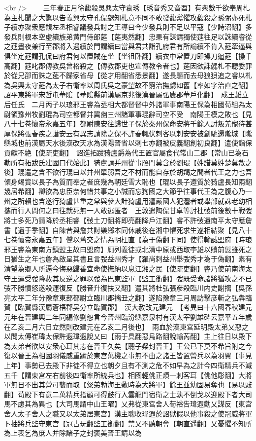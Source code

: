 <br />
　　三年春正月徐馥殺吳興太守袁琇【琇音秀又音酉】有衆數千欲奉周札為主札聞之大驚以告義興太守孔侃勰知札意不同不敢發馥黨懼攻馥殺之孫弼亦死札子續亦聚衆應馥左丞相睿議發兵討之王導曰今少發兵則不足以平寇【少詩沼翻】多發兵則根本空虛續族弟黄門侍郎莚【莚夷然翻】忠果有謀請獨使莚往足以誅續睿從之莚晝夜兼行至郡將入遇續於門謂續曰當與君共詣孔府君有所論續不肯入莚牽逼與俱坐定莚謂孔侃曰府君何以置賊在坐【坐徂卧翻】續衣中常置刀即操刀逼莚【操千高翻】莚叱郡傳教吳曾格殺之【傳教郡吏也宣傳教令者也】莚因欲誅勰札不聽委罪於從兄邵而誅之莚不歸家省母【從才用翻省悉景翻】遂長驅而去母狼狽追之睿以札為吳興太守莚為太子右衛率以周氏吳之豪望故不窮治撫勰如舊【率如字治直之翻】　詔平東將軍宋哲屯華隂【華隂縣前漢屬京兆後漢晉屬弘農郡華戶化翻】　成王雄立后任氏　二月丙子以琅邪王睿為丞相大都督督中外諸軍事南陽王保為相國荀組為太尉領豫州牧劉琨為司空都督并冀幽三州諸軍事琨辭司空不受　南陽王模之敗也【見八十七卷懷帝永嘉五年】都尉陳安往歸世子保於秦州保命安將千餘人討叛羌寵待甚厚保將張春疾之譖安云有異志請除之保不許春輒伏刺客以刺安安被創馳還隴城【隴縣城也前漢屬天水後漢改天水為漢陽晉省以刺七亦翻被皮義翻創初良翻】遣使詣保貢獻不絶【使疏吏翻】　詔進拓跋猗盧爵為代王置官屬食代常山二郡【常山已為石勒所有拓跋氏建國曰代始此】猗盧請并州從事鴈門莫含於劉琨【姓譜莫姓楚莫敖之後】琨遣之含不欲行琨曰以并州單弱吾之不材而能自存於胡羯之間者代王之力也吾傾身竭貲以長子為質而奉之者庶幾為朝廷雪大恥也【琨以長子遵質於猗盧長知兩翻幾居希翻】卿欲為忠臣奈何惜共事之小誠而忘狥國之大節乎往事代王為之腹心乃一州之所賴也含遂行猗盧甚重之常與參大計猗盧用灋嚴國人犯灋者或舉部就誅老幼相攜而行人問何之曰往就死無一人敢逃匿者　王敦遣陶侃甘卓等討杜弢前後數十戰弢將士多死乃請降於丞相睿【弢土刀翻將即亮翻降戶江翻】睿不許弢遺南平太守應詹書【遺于季翻】自陳昔與詹共討樂鄉本同休戚後在湘中懼死求生遂相結聚【見八十七卷懷帝永嘉五年】儻以舊交之情為明枉直【為于偽翻下同】使得輸誠盟府【時琅邪王睿為東南方鎮盟主故曰盟府】厠列義徒或北清中原或西取李雄以贖前愆雖死之日猶生之年也詹為啟呈其書且言弢益州秀才【羅尚刺益州舉弢秀才為于偽翻】素有清望為鄉人所逼今悔惡歸善宜命使撫納以息江湘之民【使疏吏翻】睿乃使前南海太守王運受弢降赦其反逆之罪以弢為巴東監軍【監工銜翻】弢既受命諸將猶攻之不已弢不勝憤怒遂殺運復反【勝音升復扶又翻】遣其將杜弘張彦殺臨川内史謝摛【吳孫亮太平二年分豫章東部都尉立臨川郡摛丑之翻】遂陷豫章三月周訪擊彦斬之弘犇臨賀【臨賀縣漢屬蒼梧郡吴分立臨賀郡】　漢大赦改元建元　【考異曰十六國春秋建元元年在晉建興二年同編修劉恕言今晉州臨汾縣嘉泉村有漢太宰劉雄碑云嘉平五年歲在乙亥二月六日立然則改建元在乙亥二月後也】　雨血於漢東宫延明殿太弟乂惡之以問太傅崔瑋太保許遐瑋遐說乂曰【雨于具翻惡烏路翻說輸芮翻】主上往日以殿下為太弟者欲以安衆心耳其志在晉王久矣【聰子粲封晉王】王公已下莫不希旨附之今復以晉王為相國羽儀威重踰於東宫萬機之事無不由之諸王皆置營兵以為羽翼【事見上年】事勢已去殿下非徒不得立也朝夕且有不測之危不如早為之計今四衛精兵不減五千【謂東宫左右前後四衛率所統兵也】相國輕佻正煩一刺客耳【佻他彫翻】大將軍無日不出其營可襲而取【粲弟勃海王敷時為大將軍】餘王並幼固易奪也【易以䜴翻】苟殿下有意二萬精兵指顧可得鼓行入雲龍門宿衛之士孰不倒戈以迎殿下者大司馬不慮其為異也【大司馬謂中山王曜】乂弗從東宫舍人荀裕告瑋遐勸乂謀反【東宫舍人太子舍人之職又以太弟居東宫】漢主聰收瑋遐於詔獄假以他事殺之使冠威將軍卜抽將兵監守東宫【冠古玩翻監工銜翻】禁乂不聽朝會【朝直遥翻】乂憂懼不知所為上表乞為庶人并除諸子之封褒美晉王請以為